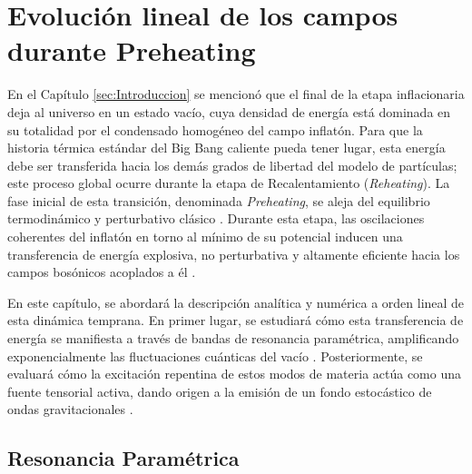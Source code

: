 \chapter{Evolución lineal de los campos durante Preheating} \label{sec:cap3}

En el Capítulo \ref{sec:Introduccion} se mencionó que el final de la etapa inflacionaria deja al universo en un estado vacío, cuya densidad de energía está dominada en su totalidad por el condensado homogéneo del campo inflatón. Para que la historia térmica estándar del Big Bang caliente pueda tener lugar, esta energía debe ser transferida hacia los demás grados de libertad del modelo de partículas; este proceso global ocurre durante la etapa de Recalentamiento (\textit{Reheating}). La fase inicial de esta transición, denominada \textit{Preheating}, se aleja del equilibrio termodinámico y perturbativo clásico \cite{Amin_2014}. Durante esta etapa, las oscilaciones coherentes del inflatón en torno al mínimo de su potencial inducen una transferencia de energía explosiva, no perturbativa y altamente eficiente hacia los campos bosónicos acoplados a él \cite{Amin_2014, Kofman_1994, Kofman_1997}. 

En este capítulo, se abordará la descripción analítica y numérica a orden lineal de esta dinámica temprana. En primer lugar, se estudiará cómo esta transferencia de energía se manifiesta a través de bandas de resonancia paramétrica, amplificando exponencialmente las fluctuaciones cuánticas del vacío \cite{Kofman_1994, Kofman_1997}. Posteriormente, se evaluará cómo la excitación repentina de estos modos de materia actúa como una fuente tensorial activa, dando origen a la emisión de un fondo estocástico de ondas gravitacionales \cite{Caprini_2020, Dufaux_2007, Figueroa_2017_GW}.

\section{Resonancia Paramétrica}

